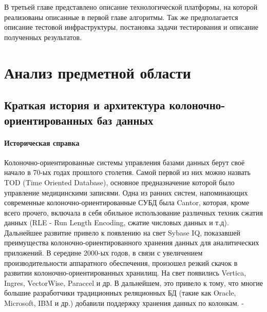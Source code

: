 \documentclass{matmex-diploma}
\begin{document}
    В третьей главе представлено описание технологической платформы, на которой реализованы описанные в первой главе алгоритмы. Так же предполагается описание тестовой инфраструктуры, постановка задачи тестирования и описание полученных результатов.
    
\section{Анализ предметной области}
    \subsection{Краткая история и архитектура колоночно-ориентированных баз данных}
        \paragraph{Историческая справка}
            Колоночно-ориентированные системы управления базами данных берут своё начало в 70-ых годах прошлого столетия. Самой первой из них можно назвать TOD (Time Oriented Database), основное предназначение которой было управление медицинскими записями. Одна из ранних систем, напоминающих современные колоночно-ориентированные СУБД была Cantor, которая, кроме всего прочего, включала в себя обильное использование различных техник сжатия данных (RLE - Run Length Encoding, сжатие числовых данных и т.д). Дальнейшее развитие привело к появлению на свет Sybase IQ, показавшей преимущества колоночно-ориентированного хранения данных для аналитических приложений. В середине 2000-ых годов, в связи с увеличением производительности аппаратного обеспечения, произошел резкий скачок в развитии колоночно-ориентированных хранилищ. На свет появились Vertica, Ingres, VectorWise, Paraccel и др. В дальнейшем, это привело к тому, что многие большие разработчики традиционных реляционных БД (такие как Oracle, Microsoft, IBM и др.) добавили поддержку хранения данных по колонкам. - \cite{abadidesign}
\end{document}
